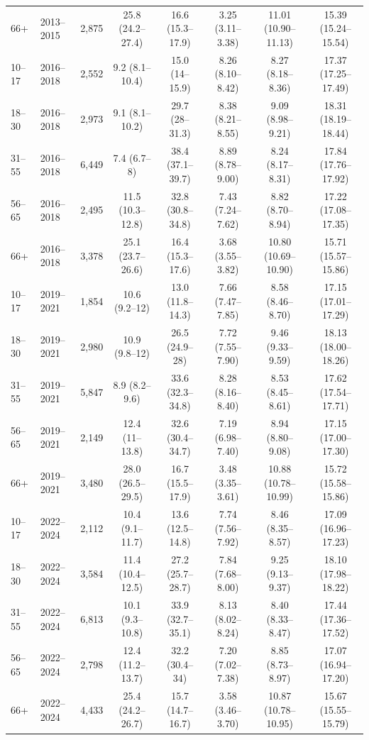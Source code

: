 \begin{tabular}{l l r c c c c c}
66+ & 2013--2015 & 2,875 & 25.8 (24.2--27.4) & 16.6 (15.3--17.9) & 3.25 (3.11--3.38) & 11.01 (10.90--11.13) & 15.39 (15.24--15.54) \\
10--17 & 2016--2018 & 2,552 & 9.2 (8.1--10.4) & 15.0 (14--15.9) & 8.26 (8.10--8.42) & 8.27 (8.18--8.36) & 17.37 (17.25--17.49) \\
18--30 & 2016--2018 & 2,973 & 9.1 (8.1--10.2) & 29.7 (28--31.3) & 8.38 (8.21--8.55) & 9.09 (8.98--9.21) & 18.31 (18.19--18.44) \\
31--55 & 2016--2018 & 6,449 & 7.4 (6.7--8) & 38.4 (37.1--39.7) & 8.89 (8.78--9.00) & 8.24 (8.17--8.31) & 17.84 (17.76--17.92) \\
56--65 & 2016--2018 & 2,495 & 11.5 (10.3--12.8) & 32.8 (30.8--34.8) & 7.43 (7.24--7.62) & 8.82 (8.70--8.94) & 17.22 (17.08--17.35) \\
66+ & 2016--2018 & 3,378 & 25.1 (23.7--26.6) & 16.4 (15.3--17.6) & 3.68 (3.55--3.82) & 10.80 (10.69--10.90) & 15.71 (15.57--15.86) \\
10--17 & 2019--2021 & 1,854 & 10.6 (9.2--12) & 13.0 (11.8--14.3) & 7.66 (7.47--7.85) & 8.58 (8.46--8.70) & 17.15 (17.01--17.29) \\
18--30 & 2019--2021 & 2,980 & 10.9 (9.8--12) & 26.5 (24.9--28) & 7.72 (7.55--7.90) & 9.46 (9.33--9.59) & 18.13 (18.00--18.26) \\
31--55 & 2019--2021 & 5,847 & 8.9 (8.2--9.6) & 33.6 (32.3--34.8) & 8.28 (8.16--8.40) & 8.53 (8.45--8.61) & 17.62 (17.54--17.71) \\
56--65 & 2019--2021 & 2,149 & 12.4 (11--13.8) & 32.6 (30.4--34.7) & 7.19 (6.98--7.40) & 8.94 (8.80--9.08) & 17.15 (17.00--17.30) \\
66+ & 2019--2021 & 3,480 & 28.0 (26.5--29.5) & 16.7 (15.5--17.9) & 3.48 (3.35--3.61) & 10.88 (10.78--10.99) & 15.72 (15.58--15.86) \\
10--17 & 2022--2024 & 2,112 & 10.4 (9.1--11.7) & 13.6 (12.5--14.8) & 7.74 (7.56--7.92) & 8.46 (8.35--8.57) & 17.09 (16.96--17.23) \\
18--30 & 2022--2024 & 3,584 & 11.4 (10.4--12.5) & 27.2 (25.7--28.7) & 7.84 (7.68--8.00) & 9.25 (9.13--9.37) & 18.10 (17.98--18.22) \\
31--55 & 2022--2024 & 6,813 & 10.1 (9.3--10.8) & 33.9 (32.7--35.1) & 8.13 (8.02--8.24) & 8.40 (8.33--8.47) & 17.44 (17.36--17.52) \\
56--65 & 2022--2024 & 2,798 & 12.4 (11.2--13.7) & 32.2 (30.4--34) & 7.20 (7.02--7.38) & 8.85 (8.73--8.97) & 17.07 (16.94--17.20) \\
66+ & 2022--2024 & 4,433 & 25.4 (24.2--26.7) & 15.7 (14.7--16.7) & 3.58 (3.46--3.70) & 10.87 (10.78--10.95) & 15.67 (15.55--15.79) \\
\bottomrule
\end{tabular}
